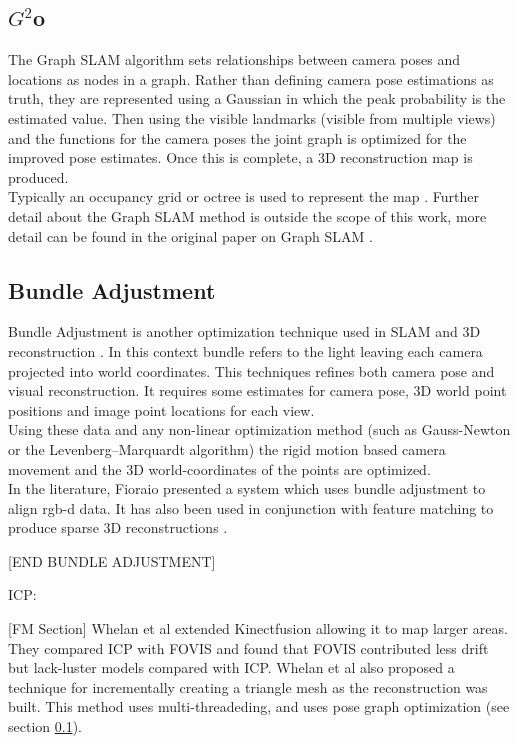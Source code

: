 
\subsection{$G^2$o}
\label{Sec:G20}
The Graph SLAM algorithm sets relationships between camera poses and locations as nodes in a graph. Rather than defining camera pose estimations as truth, they are represented using a Gaussian in which the peak probability is the estimated value. Then using the visible landmarks (visible from multiple views) and the functions for the camera poses the joint graph is optimized for the improved pose estimates. Once this is complete, a 3D reconstruction map is produced. \\

Typically an occupancy grid or octree is used to represent the map \cite{Wurm10Octomap}. Further detail about the Graph SLAM method is outside the scope of this work, more detail can be found in the original paper on Graph SLAM \cite{Kummerle11G}. \\

\subsection{Bundle Adjustment}

Bundle Adjustment is another optimization technique used in SLAM and 3D reconstruction \cite{Lourakis09Sba}. In this context bundle refers to the light leaving each camera projected into world coordinates. This techniques refines both camera pose and visual reconstruction. It requires some estimates for camera pose, 3D world point positions and image point locations for each view. \\

Using these data and any non-linear optimization method (such as Gauss-Newton or the Levenberg–Marquardt algorithm) the rigid motion based camera movement and the 3D world-coordinates of the points are optimized. \\

In the literature, Fioraio \cite{Fioraio11Realtime} presented a system which uses bundle adjustment to align rgb-d data. It has also been used in conjunction with feature matching to produce sparse 3D reconstructions \cite{Klein07Parallel,Agarwal09Building}.

[END BUNDLE ADJUSTMENT]



ICP:

[FM Section]
Whelan et al \cite{Whelan12Kintinuous} extended Kinectfusion allowing it to map larger areas. They compared ICP with FOVIS and found that FOVIS contributed less drift but lack-luster models compared with ICP. Whelan et al also proposed a technique for incrementally creating a triangle mesh as the reconstruction was built. This method uses multi-threadeding, and uses pose graph optimization (see section \ref{Sec:G20}).

